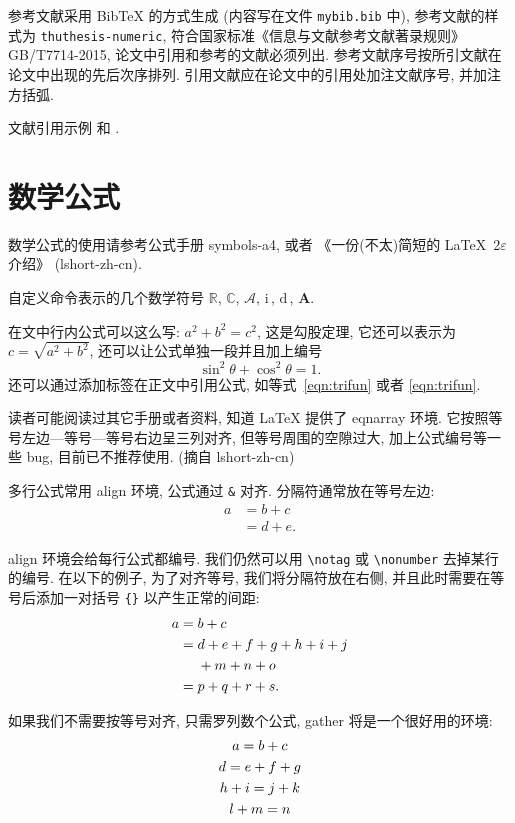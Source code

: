 \documentclass[UTF8,openany,twoside,12pt]{book}
\theoremstyle{plain}
\newcommand{\CC}{\ensuremath{\mathbb{C}}}
\newcommand{\RR}{\ensuremath{\mathbb{R}}}
\newcommand{\A}{\mathcal{A}}
\newcommand{\ii}{\bm{\mathrm{i}}\,}  %
\newcommand{\md}{\mathrm{d}\,}
\newcommand{\bA}{\boldsymbol{A}}
\begin{document}
参考文献采用 BibTeX 的方式生成 (内容写在文件 \verb|mybib.bib| 中), 参考文献的样式为 \verb|thuthesis-numeric|, 符合国家标准《信息与文献参考文献著录规则》GB/T7714-2015, 论文中引用和参考的文献必须列出. 参考文献序号按所引文献在论文中出现的先后次序排列. 引用文献应在论文中的引用处加注文献序号, 并加注方括弧.

文献引用示例 \cite{LiLiu1997} 和 \cite{Adams2003,Shen1994}.



\section{数学公式}

数学公式的使用请参考公式手册 symbols-a4, 或者 《一份(不太)简短的 \LaTeX~2$\varepsilon$ 介绍》 (lshort-zh-cn).

自定义命令表示的几个数学符号 $\RR$, $\CC$, $\A$, $\ii$, $\md$, $\bA$.

在文中行内公式可以这么写: $a^2+b^2=c^2$, 这是勾股定理, 它还可以表示为 $c=\sqrt{a^2+b^2}$, 还可以让公式单独一段并且加上编号
\begin{equation}\label{eqn:trifun}
\sin^2{\theta}+\cos^2{\theta}=1.
\end{equation}
还可以通过添加标签在正文中引用公式, 如等式~\eqref{eqn:trifun} 或者 \ref{eqn:trifun}.

读者可能阅读过其它手册或者资料, 知道 LaTeX 提供了 eqnarray 环境. 它按照等号左边—等号—等号右边呈三列对齐, 但等号周围的空隙过大, 加上公式编号等一些 bug, 目前已不推荐使用. (摘自 lshort-zh-cn)

多行公式常用 align 环境, 公式通过 \verb|&| 对齐. 分隔符通常放在等号左边:
\begin{align}
a & = b + c \\
& = d + e.
\end{align}

align 环境会给每行公式都编号. 我们仍然可以用 \verb|\notag| 或 \verb|\nonumber| 去掉某行的编号. 在以下的例子,
为了对齐等号, 我们将分隔符放在右侧, 并且此时需要在等号后添加一对括号 \verb|{}| 以产生正常的间距:
\begin{align}
a ={} & b + c \\
={} & d + e + f + g + h + i + j \notag \\
& + m + n + o \\
={} & p + q + r + s.
\end{align}

如果我们不需要按等号对齐, 只需罗列数个公式, gather 将是一个很好用的环境:
\begin{gather}
a = b + c \\
d = e + f + g \\
h + i = j + k \notag \\
l + m = n
\end{gather}
\end{document}
